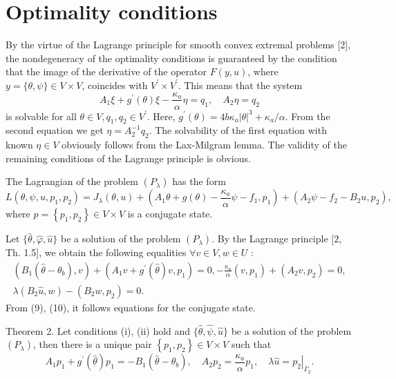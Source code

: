 \documentclass[10pt]{article}
\begin{document}
\section{Optimality conditions}
By the virtue of the Lagrange principle for smooth convex extremal problems [2], the nondegeneracy of the optimality conditions is guaranteed by the condition that the image of the derivative of the operator $F(y, u)$, where $y=\{\theta, \psi\} \in V \times V$, coincides with $V^{\prime} \times V^{\prime}$. This means that the system
$$
A_{1} \xi+g^{\prime}(\theta) \xi-\frac{\kappa_{a}}{\alpha} \eta=q_{1}, \quad A_{2} \eta=q_{2}
$$
is solvable for all $\theta \in V, q_{1}, q_{2} \in V^{\prime}$. Here, $g^{\prime}(\theta)=4 b \kappa_{a}|\theta|^{3}+\kappa_{a} / \alpha$. From the second equation we get $\eta=A_{2}^{-1} q_{2}$. The solvability of the first equation with known $\eta \in V$ obviously follows from the Lax-Milgram lemma. The validity of the remaining conditions of the Lagrange principle is obvious.

The Lagrangian of the problem $\left(P_{\lambda}\right)$ has the form
$$
L\left(\theta, \psi, u, p_{1}, p_{2}\right)=J_{\lambda}(\theta, u)+\left(A_{1} \theta+g(\theta)-\frac{\kappa_{a}}{\alpha} \psi-f_{1}, p_{1}\right)+\left(A_{2} \psi-f_{2}-B_{2} u, p_{2}\right),
$$
where $p=\left\{p_{1}, p_{2}\right\} \in V \times V$ is a conjugate state.

Let $\{\widehat{\theta}, \widehat{\varphi}, \widehat{u}\}$ be a solution of the problem $\left(P_{\lambda}\right)$. By the Lagrange principle $[2$, Th. 1.5], we obtain the following equalities $\forall v \in V, w \in U$ :
$$
\begin{gathered}
\left(B_{1}\left(\widehat{\theta}-\theta_{b}\right), v\right)+\left(A_{1} v+g^{\prime}(\widehat{\theta}) v, p_{1}\right)=0,-\frac{\kappa_{a}}{\alpha}\left(v, p_{1}\right)+\left(A_{2} v, p_{2}\right)=0, \\
\lambda\left(B_{2} \widehat{u}, w\right)-\left(B_{2} w, p_{2}\right)=0 .
\end{gathered}
$$
From (9), (10), it follows equations for the conjugate state.

Theorem 2. Let conditions (i), (ii) hold and $\{\widehat{\theta}, \widehat{\psi}, \widehat{u}\}$ be a solution of the problem $\left(P_{\lambda}\right)$, then there is a unique pair $\left\{p_{1}, p_{2}\right\} \in V \times V$ such that
$$
A_{1} p_{1}+g^{\prime}(\widehat{\theta}) p_{1}=-B_{1}\left(\widehat{\theta}-\theta_{b}\right), \quad A_{2} p_{2}=\frac{\kappa_{a}}{\alpha} p_{1}, \quad \lambda \widehat{u}=\left.p_{2}\right|_{\Gamma_{2}} .
$$
\end{document}
